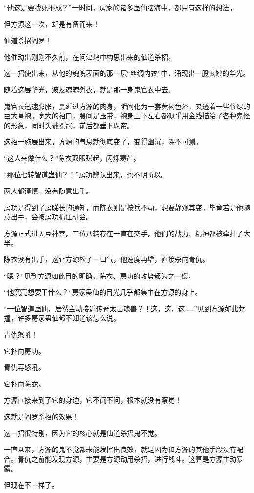 \begin{this_body}
“他这是要找死不成？”一时间，房家的诸多蛊仙脑海中，都只有这样的想法。

但方源这一次，却是有备而来！

仙道杀招阎罗！

他催动出刚刚不久前，在问津坞中构思出来的仙道杀招。

这一招使出来，从他的魂魄表面的那一层“丝绸内衣”中，涌现出一股玄妙的华光。

随着这层华光，波及魂魄外衣，就是那一身鬼官衣中去。

鬼官衣迅速膨胀，蔓延过方源的肉身，瞬间化为一套黄褐色泽，又透着一些惨绿的巨大皇袍。宽大的袖口，腰间是玉带，袍身上下左右都似乎用金线描绘了各种鬼怪的形象，同时头戴冕冠，前后都垂下珠帘。

这招一施展出来，方源的气息就彻底变了，变得幽沉，深不可测。

“这人来做什么？”陈衣双眼眯起，闪烁寒芒。

“那位七转智道蛊仙？！”房功辨认出来，也不明所以。

两人都谨慎，没有随意出手。

房功是得到了房睇长的通知，而陈衣则是按兵不动，想要静观其变。毕竟若是他随意出手，会被房功抓住机会。

方源正式进入豆神宫，三位八转存在一直在交手，他们的战力、精神都被牵扯了大半。

陈衣没有出手，这让方源松了一口气，他速度再增，直接杀向青仇。

“嗯？”见到方源如此目的明确，陈衣、房功的攻势都为之一缓。

“他究竟想要干什么？”房家蛊仙的目光几乎都集中在方源的身上。

“一位智道蛊仙，居然主动接近传奇太古魂兽？！这，这，这……”见到方源如此莽撞，许多房家蛊仙都不知道该怎么说。

青仇怒吼！

它扑向房功。

青仇再怒吼。

它扑向陈衣。

方源直接来到了它的身边，它不闻不问，根本就没有察觉！

这就是阎罗杀招的效果！

这一招很特别，因为它的核心就是仙道杀招鬼不觉。

一直以来，方源的鬼不觉都未能发挥出良效，就是因为和方源的其他手段没有配合。青仇之前能发现方源，主要是方源动用杀招，进行战斗。这算是方源主动暴露。

但现在不一样了。


\end{this_body}
